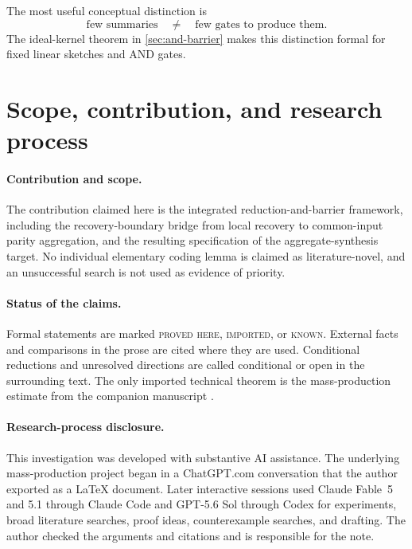 \documentclass[11pt]{article}
\theoremstyle{definition}
\theoremstyle{remark}
\newcommand{\status}[1]{\textsc{#1}}
\begin{document}
The most useful conceptual distinction is
\[
  \boxed{\text{few summaries}\quad\ne\quad\text{few gates to produce them}.}
  \tag{1.4}\label{eq:central-distinction}
\]
The ideal-kernel theorem in \cref{sec:and-barrier} makes this distinction
formal for fixed linear sketches and AND gates.

\clearpage
\tableofcontents
\clearpage

\section*{Scope, contribution, and research process}

\paragraph{Contribution and scope.}
The contribution claimed here is the integrated reduction-and-barrier
framework, including the recovery-boundary bridge from local recovery to
common-input parity aggregation, and the resulting specification of the
aggregate-synthesis target.  No individual elementary coding lemma is claimed
as literature-novel, and an unsuccessful search is not used as evidence of
priority.

\paragraph{Status of the claims.}
Formal statements are marked \status{proved here}, \status{imported}, or
\status{known}.  External facts and comparisons in the prose are cited where
they are used.  Conditional reductions and unresolved directions are called
conditional or open in the surrounding text.  The only imported technical
theorem is the mass-production estimate from the companion manuscript
\cite{Schlesinger2026}.

\paragraph{Research-process disclosure.}
This investigation was developed with substantive AI assistance.  The
underlying mass-production project began in a ChatGPT.com conversation that
the author exported as a \LaTeX{} document.  Later interactive sessions used
Claude Fable~5 and 5.1 through Claude Code and GPT-5.6 Sol through Codex
for experiments, broad literature searches, proof ideas, counterexample
searches, and drafting.  The author checked the arguments and citations and is
responsible for the note.
\end{document}
